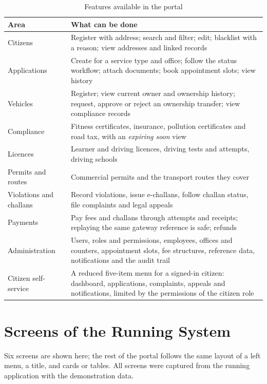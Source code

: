 \begin{table}[H]
\centering\small
\caption{Features available in the portal}\label{tab:features}
\begin{tabularx}{\linewidth}{@{}p{3.6cm}X@{}}
\toprule \textbf{Area} & \textbf{What can be done}\\ \midrule
Citizens & Register with address; search and filter; edit; blacklist with a reason; view addresses and linked records\\
Applications & Create for a service type and office; follow the status workflow; attach documents; book appointment slots; view history\\
Vehicles & Register; view current owner and ownership history; request, approve or reject an ownership transfer; view compliance records\\
Compliance & Fitness certificates, insurance, pollution certificates and road tax, with an \emph{expiring soon} view\\
Licences & Learner and driving licences, driving tests and attempts, driving schools\\
Permits and routes & Commercial permits and the transport routes they cover\\
Violations and challans & Record violations, issue e-challans, follow challan status, file complaints and legal appeals\\
Payments & Pay fees and challans through attempts and receipts; replaying the same gateway reference is safe; refunds\\
Administration & Users, roles and permissions, employees, offices and counters, appointment slots, fee structures, reference data, notifications and the audit trail\\
Citizen self-service & A reduced five-item menu for a signed-in citizen: dashboard, applications, complaints, appeals and notifications, limited by the permissions of the citizen role\\
\bottomrule
\end{tabularx}
\end{table}

\section{Screens of the Running System}
Six screens are shown here; the rest of the portal follows the same layout of a left menu,
a title, and cards or tables. All screens were captured from the running application with
the demonstration data.

